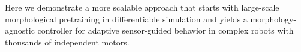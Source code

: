 Here we demonstrate a more scalable approach that starts 
with large-scale morphological pretraining 
in differentiable simulation
and yields 
a morphology-agnostic controller 
for adaptive sensor-guided behavior
in complex robots 
with thousands of independent motors.



